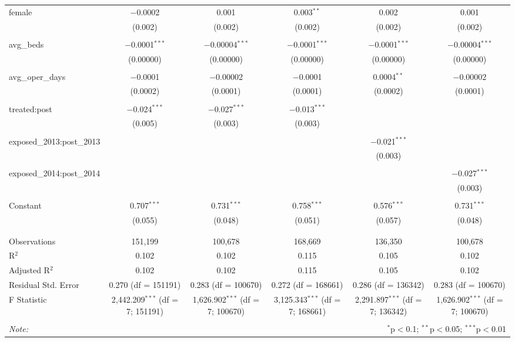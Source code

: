 \begin{table}[!htbp]
\begin{adjustbox}{width=\textwidth}
\begin{tabular}{@{\extracolsep{5pt}}lccccc}
 female & $-$0.0002 & 0.001 & 0.003$^{**}$ & 0.002 & 0.001 \\ 
  & (0.002) & (0.002) & (0.002) & (0.002) & (0.002) \\ 
  & & & & & \\ 
 avg\_beds & $-$0.0001$^{***}$ & $-$0.00004$^{***}$ & $-$0.0001$^{***}$ & $-$0.0001$^{***}$ & $-$0.00004$^{***}$ \\ 
  & (0.00000) & (0.00000) & (0.00000) & (0.00000) & (0.00000) \\ 
  & & & & & \\ 
 avg\_oper\_days & $-$0.0001 & $-$0.00002 & $-$0.0001 & 0.0004$^{**}$ & $-$0.00002 \\ 
  & (0.0002) & (0.0001) & (0.0001) & (0.0002) & (0.0001) \\ 
  & & & & & \\ 
 treated:post & $-$0.024$^{***}$ & $-$0.027$^{***}$ & $-$0.013$^{***}$ &  &  \\ 
  & (0.005) & (0.003) & (0.003) &  &  \\ 
  & & & & & \\ 
 exposed\_2013:post\_2013 &  &  &  & $-$0.021$^{***}$ &  \\ 
  &  &  &  & (0.003) &  \\ 
  & & & & & \\ 
 exposed\_2014:post\_2014 &  &  &  &  & $-$0.027$^{***}$ \\ 
  &  &  &  &  & (0.003) \\ 
  & & & & & \\ 
 Constant & 0.707$^{***}$ & 0.731$^{***}$ & 0.758$^{***}$ & 0.576$^{***}$ & 0.731$^{***}$ \\ 
  & (0.055) & (0.048) & (0.051) & (0.057) & (0.048) \\ 
  & & & & & \\ 
\hline \\[-1.8ex] 
Observations & 151,199 & 100,678 & 168,669 & 136,350 & 100,678 \\ 
R$^{2}$ & 0.102 & 0.102 & 0.115 & 0.105 & 0.102 \\ 
Adjusted R$^{2}$ & 0.102 & 0.102 & 0.115 & 0.105 & 0.102 \\ 
Residual Std. Error & 0.270 (df = 151191) & 0.283 (df = 100670) & 0.272 (df = 168661) & 0.286 (df = 136342) & 0.283 (df = 100670) \\ 
F Statistic & 2,442.209$^{***}$ (df = 7; 151191) & 1,626.902$^{***}$ (df = 7; 100670) & 3,125.343$^{***}$ (df = 7; 168661) & 2,291.897$^{***}$ (df = 7; 136342) & 1,626.902$^{***}$ (df = 7; 100670) \\ 
\hline 
\hline \\[-1.8ex] 
\textit{Note:}  & \multicolumn{5}{r}{$^{*}$p$<$0.1; $^{**}$p$<$0.05; $^{***}$p$<$0.01} \\ 
\end{tabular} 
\end{adjustbox}
\end{table} 
